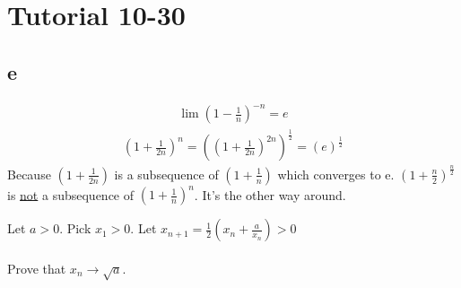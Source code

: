 \documentclass[class=scrartcl, crop=false]{standalone}
\begin{document}
\section{Tutorial 10-30}


\subsection{e}

\begin{example}
  
  \begin{enumerate}
    \ii[]
    \ii
    \begin{gather*}
      \lim(1 - \frac{1}{n})^{-n} = e
    \end{gather*}
    \ii
    \begin{gather*}
      (1 + \frac{1}{2n})^n = ((1 + \frac{1}{2n})^{2n})^\frac{1}{2} = (e)^\frac{1}{2}
    \end{gather*}
    Because $(1 + \frac{1}{2n})$ is a subsequence of $(1 + \frac{1}{n})$ which converges to e.
    \ii
    $(1 + \frac{n}{2})^{\frac{n}{2}}$ is \ul{not} a subsequence of $(1 + \frac{1}{n})^n$. It's the other way around.

  \end{enumerate}
\end{example}

Let $a > 0$. Pick $x_1 > 0$. Let $x_{n + 1} = \frac{1}{2}(x_n + \frac{a}{x_n}) > 0$ 
\\\\
Prove that $x_n \to \sqrt{a}$.
\end{document}
